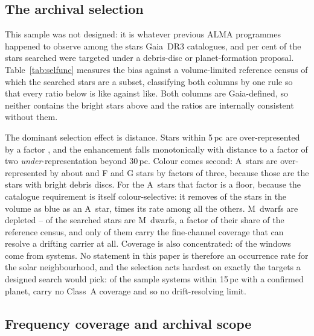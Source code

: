 \subsection{The archival selection}
\label{sec:bias}

This sample was not designed: it is whatever previous ALMA programmes
happened to observe among the stars Gaia~DR3 catalogues, and
\PctDiscProposal{} per cent of the stars searched were targeted under a
debris-disc or planet-formation proposal. Table~\ref{tab:selfunc} measures
the bias against a volume-limited reference census of which the searched
stars are a subset, classifying both columns by one rule so that every ratio
below is like against like. Both columns are Gaia-defined, so neither
contains the bright stars above and the ratios are internally consistent
without them.

The dominant selection effect is distance. Stars within 5\,pc are
over-represented by a factor \SfTopRatio, and the enhancement falls
monotonically with distance to a factor of two \emph{under}-representation
beyond 30\,pc. Colour comes second: A~stars are over-represented by about
\SfARatio{} and F and G stars by factors of three, because those are the
stars with bright debris discs. For the A~stars that factor is a floor,
because the catalogue requirement is itself colour-selective: it removes
\BsNEarly{} of the \BsNEarlyVol{} stars in the volume as blue as an A~star,
\BsEarlyRatio{} times its rate among all the others. M~dwarfs are depleted
--
\SfMSearched{} of the \SfNStar{} searched stars are M~dwarfs, a factor
\SfMRatio{} of their share of the reference census, and only
\SfMClassAStars{} of them carry the fine-channel coverage that can resolve a
drifting carrier at all. Coverage is also concentrated:
\ConcThreeWin{} of the \NWindows{} windows come from \ConcThreeSys{}
systems. No statement in this paper is therefore an occurrence rate for the
solar neighbourhood, and the selection acts hardest on
exactly the targets a designed search would pick: of the \CsIntNRow{} sample
systems within 15\,pc with a confirmed planet, \CsIntNoClassA{} carry no
Class~A coverage and so no drift-resolving limit.




\subsection{Frequency coverage and archival scope}
\label{sec:coverage}

